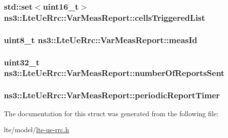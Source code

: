 \subsubsection[{\texorpdfstring{cells\+Triggered\+List}{cellsTriggeredList}}]{\setlength{\rightskip}{0pt plus 5cm}std\+::set$<$uint16\+\_\+t$>$ ns3\+::\+Lte\+Ue\+Rrc\+::\+Var\+Meas\+Report\+::cells\+Triggered\+List}\hypertarget{structns3_1_1LteUeRrc_1_1VarMeasReport_a72b521209a7147a256ddbc5db6897e13}{}\label{structns3_1_1LteUeRrc_1_1VarMeasReport_a72b521209a7147a256ddbc5db6897e13}
\subsubsection[{\texorpdfstring{meas\+Id}{measId}}]{\setlength{\rightskip}{0pt plus 5cm}uint8\+\_\+t ns3\+::\+Lte\+Ue\+Rrc\+::\+Var\+Meas\+Report\+::meas\+Id}\hypertarget{structns3_1_1LteUeRrc_1_1VarMeasReport_aaecd4fd0cc513ce3caa7704bd8366844}{}\label{structns3_1_1LteUeRrc_1_1VarMeasReport_aaecd4fd0cc513ce3caa7704bd8366844}
\subsubsection[{\texorpdfstring{number\+Of\+Reports\+Sent}{numberOfReportsSent}}]{\setlength{\rightskip}{0pt plus 5cm}uint32\+\_\+t ns3\+::\+Lte\+Ue\+Rrc\+::\+Var\+Meas\+Report\+::number\+Of\+Reports\+Sent}\hypertarget{structns3_1_1LteUeRrc_1_1VarMeasReport_a700ac90fcc3dea22e644cd9cc8fdaeb5}{}\label{structns3_1_1LteUeRrc_1_1VarMeasReport_a700ac90fcc3dea22e644cd9cc8fdaeb5}
\subsubsection[{\texorpdfstring{periodic\+Report\+Timer}{periodicReportTimer}}]{ ns3\+::\+Lte\+Ue\+Rrc\+::\+Var\+Meas\+Report\+::periodic\+Report\+Timer}\hypertarget{structns3_1_1LteUeRrc_1_1VarMeasReport_aa84dd21a285a9467d430c3024516debf}{}\label{structns3_1_1LteUeRrc_1_1VarMeasReport_aa84dd21a285a9467d430c3024516debf}


The documentation for this struct was generated from the following file\+:\begin{DoxyCompactItemize}
\item 
lte/model/\hyperlink{lte-ue-rrc_8h}{lte-\/ue-\/rrc.\+h}\end{DoxyCompactItemize}
